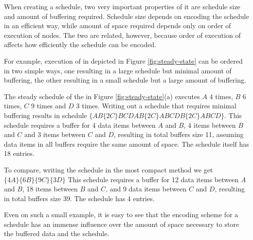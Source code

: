 \begin{comment}
\begin{figure}
\begin{center}

\psfig{figure=pipeline-buffers.eps,width=0.6in} \caption[4 {\filter}
{\pipeline}]{Sample 4 {\filter} {\pipeline}.  This {\pipeline} is
the same as one in Figure \ref{fig:steady-state} (a), except that
its children do not peek extra data} \label{fig:pipeline-buffers}
\end{center}
\end{figure}
\end{comment}

When creating a schedule, two very important properties of it are
schedule size and amount of buffering required.  Schedule size
depends on encoding the schedule in an efficient way, while amount
of space required depends only on order of execution of nodes. The
two are related, however, because order of execution of {\filters}
affects how efficiently the schedule can be encoded.

For example, execution of {\filters} in {\pipeline} depicted in
Figure \ref{fig:steady-state} can be ordered in two simple ways,
one resulting in a large schedule but minimal amount of buffering,
the other resulting in a small schedule but a large amount of
buffering.

The steady schedule of the {\pipeline} in Figure
\ref{fig:steady-state}(a) executes {\filter} $A$ 4 times,
{\filter} $B$ 6 times, {\filter} $C$ 9 times and {\filter} $D$ 3
times. Writing out a schedule that requires minimal buffering
results in schedule $\{AB\{2C\}BCDAB\{2C\}ABCDB\{2C\}ABCD\}$. This
schedule requires a buffer for 4 data items between {\filters} $A$
and $B$, 4 items between $B$ and $C$ and 3 items between $C$ and
$D$, resulting in total buffers size 11, assuming data items in
all buffers require the same amount of space. The schedule itself
has 18 entries.

To compare, writing the schedule in the most compact method we get
$\{4A\}\{6B\}\{9C\}\{3D\}$  This schedule requires a buffer for 12
data items between {\filters} $A$ and $B$, 18 items between $B$
and $C$, and 9 data items between $C$ and $D$, resulting in total
buffers size 39.  The schedule has 4 entries.

Even on such a small example, it is easy to see that the encoding
scheme for a schedule has an immense influence over the amount of
space necessary to store the buffered data and the schedule.

